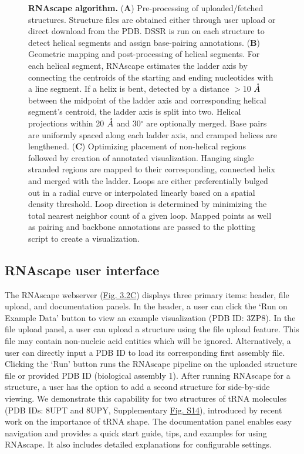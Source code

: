 \addtocounter{figure}{-1}
\begin{center}
\begin{figure} 
  \caption[]{\textbf{RNAscape algorithm.} ({\bf A})  Pre-processing of uploaded/fetched structures. Structure files are obtained either through user upload or direct download from the PDB. DSSR is run on each structure to detect helical segments and assign base-pairing annotations. ({\bf B}) Geometric mapping and post-processing of helical segments. For each helical segment, RNAscape estimates the ladder axis by connecting the centroids of the starting and ending nucleotides with a line segment. If a helix is bent, detected by a distance $>$10 $\AA$ between the midpoint of the ladder axis and corresponding helical segment's centroid, the ladder axis is split into two. Helical projections within 20 $\AA$ and 30$^{\circ}$ are optionally merged. Base pairs are uniformly spaced along each ladder axis, and cramped helices are lengthened. ({\bf C}) Optimizing placement of non-helical regions followed by creation of annotated visualization. Hanging single stranded regions are mapped to their corresponding, connected helix and merged with the ladder. Loops are either preferentially bulged out in a radial curve or interpolated linearly based on a spatial density threshold. Loop direction is determined by minimizing the total nearest neighbor count of a given loop. Mapped points as well as pairing and backbone annotations are passed to the plotting script to create a visualization.}
\end{figure}
\end{center}
\subsection{RNAscape user interface}

The RNAscape webserver (\hyperref[fig:rnascape2]{Fig. 3.2C}) displays three primary items: header, file upload, and documentation panels. In the header, a user can click the ‘Run on Example Data’ button to view an example visualization (PDB ID: 3ZP8). In the file upload panel, a user can upload a structure using the file upload feature. This file may contain non-nucleic acid entities which will be ignored. Alternatively, a user can directly input a PDB ID to load its corresponding first assembly file. Clicking the ‘Run’ button runs the RNAscape pipeline on the uploaded structure file or provided PDB ID (biological assembly 1). After running RNAscape for a structure, a user has the option to add a second structure for side-by-side viewing. We demonstrate this capability for two structures of tRNA molecules (PDB IDs: 8UPT and 8UPY, Supplementary \hyperref[fig:rnascapeS2]{Fig. S14}), introduced by recent work \citep{Krahn2024} on the importance of tRNA shape. The documentation panel enables easy navigation and provides a quick start guide, tips, and examples for using RNAscape. It also includes detailed explanations for configurable settings.

